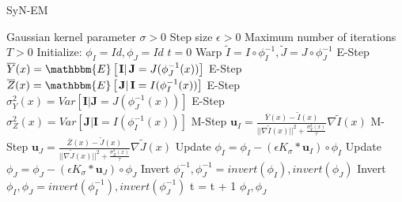 \begin{algorithm}[h!]
\caption{SyN-EM}\label{alg:SyNEM}
\begin{algorithmic}[1]
\REQUIRE Gaussian kernel parameter $\sigma>0$
\REQUIRE Step size $\epsilon>0$
\REQUIRE Maximum number of iterations $T>0$
\STATE Initialize: $\phi_{I} = Id, \phi_{J} = Id$
\STATE $t=0$
\REPEAT
    \STATE Warp $\tilde{I}  = I \circ \phi_{I}^{-1}, \tilde{J} = J \circ \phi_{J}^{-1}$
    \STATE E-Step $\overline{Y}(x) = \mathbbm{E}\left[\left.\mathbf{I}\right| \mathbf{J}= J(\phi_{J}^{-1}(x))\right]$
    \STATE E-Step $\overline{Z}(x) = \mathbbm{E}\left[\left.\mathbf{J}\right| \mathbf{I}= I(\phi_{I}^{-1}(x))\right]$
    \STATE E-Step $\sigma^{2}_{Y}(x) = Var\left[\left.\mathbf{I}\right| \mathbf{J}= J(\phi_{J}^{-1}(x))\right]$
    \STATE E-Step $\sigma^{2}_{Z}(x) = Var\left[\left.\mathbf{J}\right| \mathbf{I}= I(\phi_{I}^{-1}(x))\right]$
    \STATE M-Step $\mathbf{u}_{I} = \frac{\overline{Y}(x) - \tilde{I}(x)}{||\nabla \tilde{I}(x)||^{2} + \frac{\sigma_{Y}^{2}(x)}{\tau}}\nabla \tilde{I}(x)$
    \STATE M-Step $\mathbf{u}_{J} = \frac{\overline{Z}(x) - \tilde{J}(x)}{||\nabla \tilde{J}(x)||^{2} + \frac{\sigma_{Z}^{2}(x)}{\tau}}\nabla \tilde{J}(x)$
    \STATE Update $\phi_{I} = \phi_{I} - \left(\epsilon K_{\sigma} \ast \mathbf{u}_{I} \right)\circ \phi_{I}$
    \STATE Update $\phi_{J} = \phi_{J} - \left(\epsilon K_{\sigma} \ast \mathbf{u}_{J} \right)\circ \phi_{J}$
    \STATE Invert $\phi_{I}^{-1}, \phi_{J}^{-1} = invert(\phi_{I}), invert(\phi_{J})$
    \STATE Invert $\phi_{I}, \phi_{J} = invert(\phi_{I}^{-1}), invert(\phi_{J}^{-1})$
    \STATE t = t + 1
\RETURN $\phi_{I}, \phi_{J}$
\end{algorithmic}
\end{algorithm}


